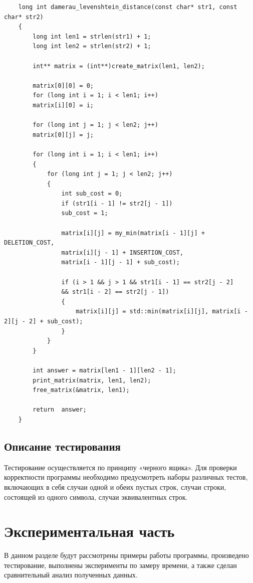 \documentclass[12pt]{report}
\begin{document}
\begin{lstlisting}
	long int damerau_levenshtein_distance(const char* str1, const char* str2)
	{
		long int len1 = strlen(str1) + 1;
		long int len2 = strlen(str2) + 1;

		int** matrix = (int**)create_matrix(len1, len2);
		
		matrix[0][0] = 0;
		for (long int i = 1; i < len1; i++)
		matrix[i][0] = i;
		
		for (long int j = 1; j < len2; j++)
		matrix[0][j] = j;
		
		for (long int i = 1; i < len1; i++)
		{
			for (long int j = 1; j < len2; j++)
			{
				int sub_cost = 0;
				if (str1[i - 1] != str2[j - 1])
				sub_cost = 1;
				
				matrix[i][j] = my_min(matrix[i - 1][j] + DELETION_COST,
				matrix[i][j - 1] + INSERTION_COST,
				matrix[i - 1][j - 1] + sub_cost);
				
				if (i > 1 && j > 1 && str1[i - 1] == str2[j - 2]
				&& str1[i - 2] == str2[j - 1])
				{
					matrix[i][j] = std::min(matrix[i][j], matrix[i - 2][j - 2] + sub_cost);
				}
			}
		}
		
		int answer = matrix[len1 - 1][len2 - 1];
		print_matrix(matrix, len1, len2);		
		free_matrix(&matrix, len1);
		
		return  answer;
	}
\end{lstlisting}

\section{Описание тестирования}
Тестирование осуществляется по принципу «черного ящика».
Для проверки корректности программы необходимо предусмотреть наборы различных тестов,
включающих в себя случаи одной и обеих пустых строк, случаи строки, состоящей из одного
символа, случаи эквивалентных строк.


\chapter{Экспериментальная часть}
В данном разделе будут рассмотрены примеры работы программы, произведено тестирование,
выполнены эксперименты по замеру времени, а также сделан сравнительный анализ
полученных данных.
\end{document}
